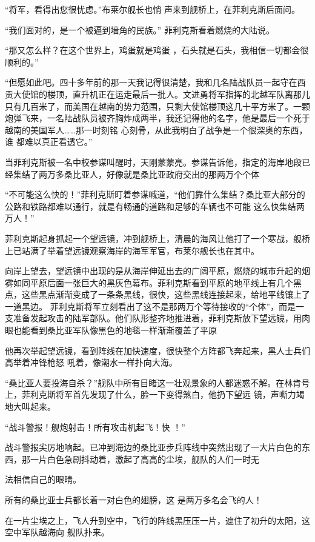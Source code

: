 \documentclass{article}
\begin{document}
“将军，看得出您很忧虑。”布莱尔舰长也悄
声来到舰桥上，在菲利克斯后面问。 

“我们面对的，是一个被逼到墙角的民族。”
菲利克斯看着燃烧的大陆说。 

“那又怎么样？在这个世界上，鸡蛋就是鸡蛋
，石头就是石头，我相信一切都会很顺利的。” 

“但愿如此吧。四十多年前的那一天我记得很清楚，我和几名陆战队员一起守在西贡大使馆的楼顶，直升机正在运走最后一批人。文进勇将军指挥的北越军队离那儿只有几百米了，而美国在越南的势力范围，只剩大使馆楼顶这几十平方米了。一颗炮弹飞来，一名陆战队员被齐胸炸成两半，我还记得他的名字，他是最后一个死于越南的美国军人……那一时刻铭
\newpage
心刻骨，从此我明白了战争是一个很深奥的东西，谁
都难以真正看透它。” 

当菲利克斯被一名中校参谋叫醒时，天刚蒙蒙亮。参谋告诉他，指定的海岸地段已经集结了两万多桑比亚人，好像就是桑比亚政府交出的那两万个个体

“不可能这么快的！”菲利克斯盯着参谋喊道，“他们靠什么集结？桑比亚大部分的公路和铁路都难以通行，就是有畅通的道路和足够的车辆也不可能
这么快集结两万人！” 

菲利克斯起身抓起一个望远镜，冲到舰桥上，清晨的海风让他打了一个寒战，舰桥上已站满了举着望远镜观察海岸的海军军官，布莱尔舰长也在其中。

向岸上望去，望远镜中出现的是从海岸伸延出去的广阔平原，燃烧的城市升起的烟雾如同平原后面一张巨大的黑灰色幕布。菲利克斯看到平原的地平线上有几个黑点，这些黑点渐渐变成了一条条黑线，很快，这些黑线连接起来，给地平线镶上了一道黑边。
\newpage
菲利克斯将军立刻看出了这不是那两万个等待接收的“个体”，而是一支准备发起攻击的陆军部队。他们队形整齐地推进着，菲利克斯放下望远镜，用肉眼也能看到桑比亚军队像黑色的地毯一样渐渐覆盖了平原

他再次举起望远镜，看到阵线在加快速度，很快整个方阵都飞奔起来，黑人士兵们高举着冲锋枪怒
吼着，像潮水一样扑向大海。 

“桑比亚人要投海自杀？”舰队中所有目睹这一壮观景象的人都迷惑不解。在林肯号上，菲利克斯将军首先发现了什么，脸一下变得煞白，他扔下望远
镜，声嘶力竭地大叫起来。 

“战斗警报！舰炮射击！所有攻击机起飞！快
！” 

战斗警报尖厉地响起。已冲到海边的桑比亚步兵阵线中突然出现了一大片白色的东西，那一片白色急剧抖动着，激起了高高的尘埃，舰队的人们一时无

\newpage
法相信自己的眼睛。 

所有的桑比亚士兵都长着一对白色的翅膀，这
是两万多名会飞的人！ 

在一片尘埃之上，飞人升到空中，飞行的阵线黑压压一片，遮住了初升的太阳，这空中军队越海向
舰队扑来。 
\end{document}
